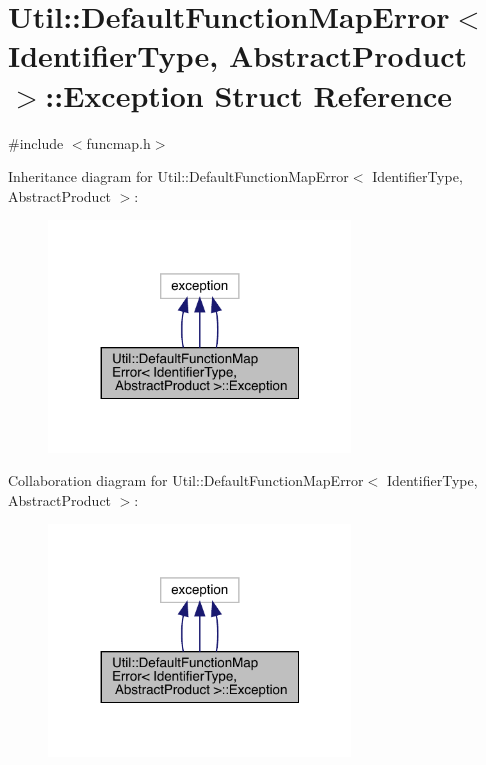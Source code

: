 \hypertarget{structUtil_1_1DefaultFunctionMapError_1_1Exception}{}\section{Util\+:\+:Default\+Function\+Map\+Error$<$ Identifier\+Type, Abstract\+Product $>$\+:\+:Exception Struct Reference}
\label{structUtil_1_1DefaultFunctionMapError_1_1Exception}


{\ttfamily \#include $<$funcmap.\+h$>$}



Inheritance diagram for Util\+:\+:Default\+Function\+Map\+Error$<$ Identifier\+Type, Abstract\+Product $>$\+:
\nopagebreak
\begin{figure}[H]
\begin{center}
\leavevmode
\includegraphics[width=227pt]{df/d36/structUtil_1_1DefaultFunctionMapError_1_1Exception__inherit__graph}
\end{center}
\end{figure}


Collaboration diagram for Util\+:\+:Default\+Function\+Map\+Error$<$ Identifier\+Type, Abstract\+Product $>$\+:
\nopagebreak
\begin{figure}[H]
\begin{center}
\leavevmode
\includegraphics[width=227pt]{df/d10/structUtil_1_1DefaultFunctionMapError_1_1Exception__coll__graph}
\end{center}
\end{figure}

